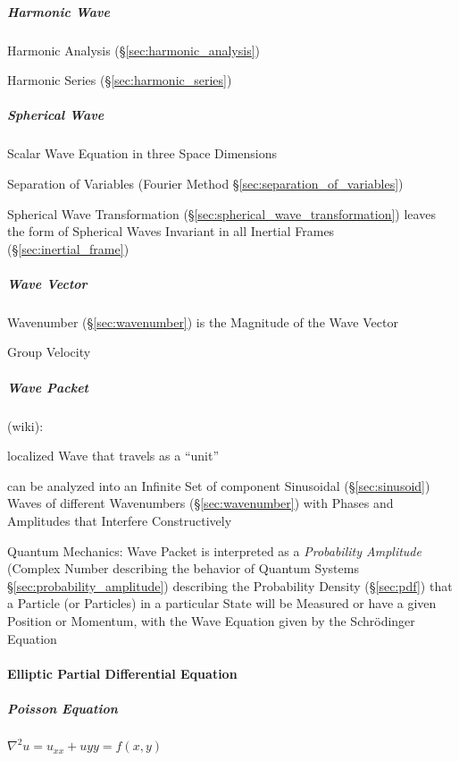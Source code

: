 \subparagraph{Harmonic Wave}\label{sec:harmonic_wave}\hfill

\fist Harmonic Analysis (\S\ref{sec:harmonic_analysis})

\fist Harmonic Series (\S\ref{sec:harmonic_series})



\subparagraph{Spherical Wave}\label{sec:spherical_wave}\hfill

Scalar Wave Equation in three Space Dimensions

Separation of Variables (Fourier Method \S\ref{sec:separation_of_variables})

Spherical Wave Transformation (\S\ref{sec:spherical_wave_transformation})
leaves the form of Spherical Waves Invariant in all Inertial Frames
(\S\ref{sec:inertial_frame})



\subparagraph{Wave Vector}\label{sec:wave_vector}\hfill

Wavenumber (\S\ref{sec:wavenumber}) is the Magnitude of the Wave Vector

Group Velocity



\subparagraph{Wave Packet}\label{sec:wave_packet}\hfill

(wiki):

localized Wave that travels as a ``unit''

can be analyzed into an Infinite Set of component Sinusoidal
(\S\ref{sec:sinusoid}) Waves of different Wavenumbers (\S\ref{sec:wavenumber})
with Phases and Amplitudes that Interfere Constructively

Quantum Mechanics: Wave Packet is interpreted as a \emph{Probability Amplitude}
(Complex Number describing the behavior of Quantum Systems
\S\ref{sec:probability_amplitude}) describing the Probability Density
(\S\ref{sec:pdf}) that a Particle (or Particles) in a particular State will be
Measured or have a given Position or Momentum, with the Wave Equation given by
the Schr\"odinger Equation



\paragraph{Elliptic Partial Differential Equation}
\label{sec:elliptic_partial_differential}\hfill

\subparagraph{Poisson Equation}\label{sec:poisson_equation}\hfill

$\nabla^2 u = u_{xx} + u{yy} = f(x,y)$



